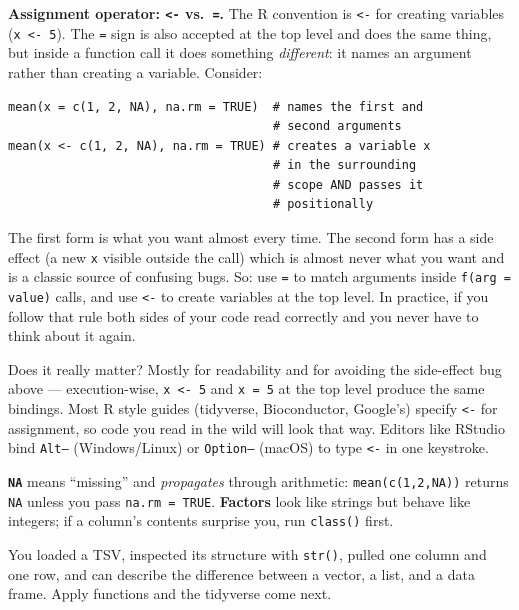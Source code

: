 \begin{tipbox}
\textbf{Assignment operator: \texttt{<-} vs.\ \texttt{=}.} The R convention is \texttt{<-} for creating variables (\texttt{x <- 5}). The \texttt{=} sign is also accepted at the top level and does the same thing, but inside a function call it does something \textit{different}: it names an argument rather than creating a variable. Consider:
\begin{lstlisting}
mean(x = c(1, 2, NA), na.rm = TRUE)  # names the first and
                                     # second arguments
mean(x <- c(1, 2, NA), na.rm = TRUE) # creates a variable x
                                     # in the surrounding
                                     # scope AND passes it
                                     # positionally
\end{lstlisting}
The first form is what you want almost every time. The second form has a side effect (a new \texttt{x} visible outside the call) which is almost never what you want and is a classic source of confusing bugs. So: use \texttt{=} to match arguments inside \texttt{f(arg = value)} calls, and use \texttt{<-} to create variables at the top level. In practice, if you follow that rule both sides of your code read correctly and you never have to think about it again.

Does it really matter? Mostly for readability and for avoiding the side-effect bug above --- execution-wise, \texttt{x <- 5} and \texttt{x = 5} at the top level produce the same bindings. Most R style guides (tidyverse, Bioconductor, Google's) specify \texttt{<-} for assignment, so code you read in the wild will look that way. Editors like RStudio bind \texttt{Alt--} (Windows/Linux) or \texttt{Option--} (macOS) to type \texttt{<-} in one keystroke.

\textbf{\texttt{NA}} means ``missing'' and \textit{propagates} through arithmetic: \texttt{mean(c(1,2,NA))} returns \texttt{NA} unless you pass \texttt{na.rm = TRUE}. \textbf{Factors} look like strings but behave like integers; if a column's contents surprise you, run \texttt{class()} first.
\end{tipbox}
\begin{winbox}[Checkpoint]
You loaded a TSV, inspected its structure with \texttt{str()}, pulled one column and one row, and can describe the difference between a vector, a list, and a data frame. Apply functions and the tidyverse come next.
\end{winbox}


